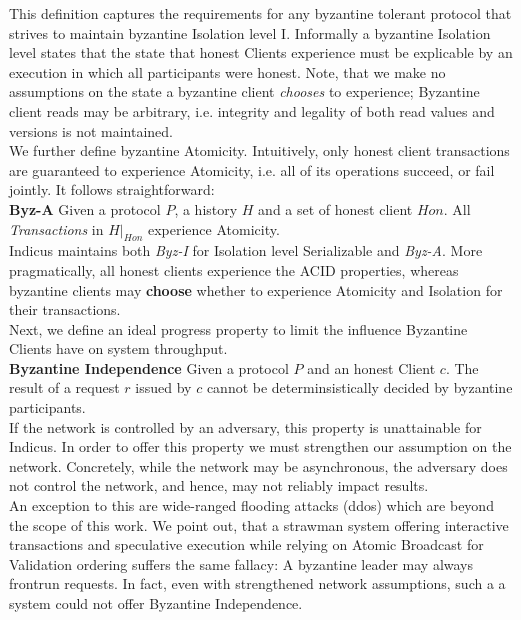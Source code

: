 This definition captures the requirements for any byzantine tolerant protocol that strives to maintain byzantine Isolation level I.
Informally a byzantine Isolation level states that the state that honest Clients experience must be explicable by an execution in which all participants were honest. Note, that we make no assumptions on the state a byzantine client \textit{chooses} to experience; Byzantine client reads may be arbitrary, i.e. integrity and legality of both read values and versions is not maintained. \\
We further define byzantine Atomicity. Intuitively, only honest client transactions are guaranteed to experience Atomicity, i.e. all of its operations succeed, or fail jointly. It follows straightforward:\\
\textbf{Byz-A} Given a protocol $P$, a history $H$ and a set of honest client $Hon$. All \textit{Transactions} in $H|_{Hon}$ experience Atomicity.\\

Indicus maintains both \textit{Byz-I} for Isolation level Serializable and \textit{Byz-A}. More pragmatically, all honest clients experience the ACID properties, whereas byzantine clients may \textbf{choose} whether to experience Atomicity and Isolation for their transactions.\\

Next, we define an ideal progress property to limit the influence Byzantine Clients have on system throughput. \\

\textbf{Byzantine Independence}
Given a protocol $P$ and an honest Client $c$. The result of a request $r$ issued by $c$ cannot be determinsistically decided by byzantine participants.  \\

If the network is controlled by an adversary, this property is unattainable for Indicus. 
In order to offer this property we must strengthen our assumption on the network. Concretely, while the network may be asynchronous, the adversary does not control the network, and hence, may not reliably impact results. \\
An exception to this are wide-ranged flooding attacks (ddos) which are beyond the scope of this work.
We point out, that a strawman system offering interactive transactions and speculative execution while relying on Atomic Broadcast for Validation ordering suffers the same fallacy: A byzantine leader may always frontrun requests. In fact, even with strengthened network assumptions, such a a system could not offer Byzantine Independence.\\


